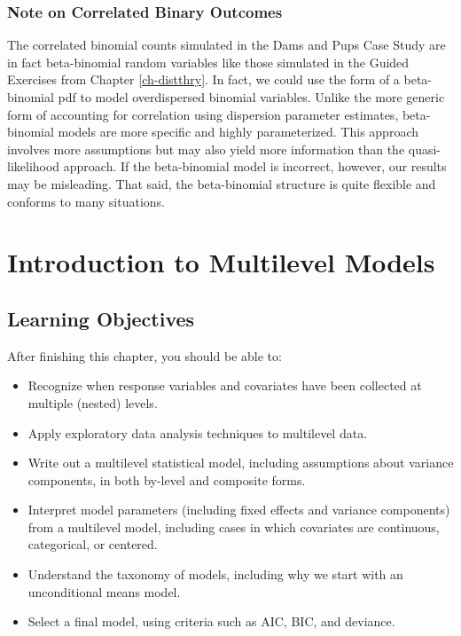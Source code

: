 \documentclass[
]{krantz}
\providecommand{\tightlist}{%
  \setlength{\itemsep}{0pt}\setlength{\parskip}{0pt}}
\begin{document}
\hypertarget{note-on-correlated-binary-outcomes}{%
\subsection{Note on Correlated Binary Outcomes}\label{note-on-correlated-binary-outcomes}}

The correlated binomial counts simulated in the Dams and Pups Case Study are in fact beta-binomial random variables like those simulated in the Guided Exercises from Chapter \ref{ch-distthry}. In fact, we could use the form of a beta-binomial pdf to model overdispersed binomial variables. Unlike the more generic form of accounting for correlation using dispersion parameter estimates, beta-binomial models are more specific and highly parameterized. This approach involves more assumptions but may also yield more information than the quasi-likelihood approach. If the beta-binomial model is incorrect, however, our results may be misleading. That said, the beta-binomial structure is quite flexible and conforms to many situations.

\hypertarget{ch-multilevelintro}{%
\chapter{Introduction to Multilevel Models}\label{ch-multilevelintro}}

\hypertarget{learning-objectives-7}{%
\section{Learning Objectives}\label{learning-objectives-7}}

After finishing this chapter, you should be able to:

\begin{itemize}
\tightlist
\item
  Recognize when response variables and covariates have been collected at multiple (nested) levels.
\item
  Apply exploratory data analysis techniques to multilevel data.
\item
  Write out a multilevel statistical model, including assumptions about variance components, in both by-level and composite forms.
\item
  Interpret model parameters (including fixed effects and variance components) from a multilevel model, including cases in which covariates are continuous, categorical, or centered.
\item
  Understand the taxonomy of models, including why we start with an unconditional means model.
\item
  Select a final model, using criteria such as AIC, BIC, and deviance.
\end{itemize}
\end{document}
